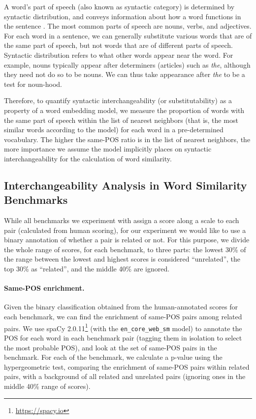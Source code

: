 \documentclass[11pt,a4paper]{article}
\begin{document}
    A word's part of speech (also known as syntactic category)
    is determined by syntactic distribution, and
    conveys information about how a word functions in the sentence \cite{carnie2002syntax}.
    The most common parts of speech are nouns, verbs, and adjectives.
    For each word in a sentence,
    we can generally substitute various words that are of the same part of speech,
    but not words that are of different parts of speech.
    Syntactic distribution refers to what other words appear
    near the word. For example, nouns typically appear after determiners (articles)
    such as \textit{the}, although they need not do so to be nouns. We can thus
    take appearance after \textit{the} to be a test for noun-hood.
    
    Therefore, to quantify syntactic interchangeability (or substitutability)
    as a property of a word embedding model,
    we measure the proportion of words with the same part of speech
    within the list of nearest neighbors
    (that is, the most similar words according to the model)
    for each word in a pre-determined vocabulary.
    The higher the same-POS ratio is in the list of nearest neighbors,
    the more importance we assume the model implicitly places on syntactic interchangeability
    for the calculation of word similarity.
    
    \subsection{Interchangeability Analysis in Word Similarity Benchmarks}\label{sec:benchmark_exp}
    
    While all benchmarks we experiment with assign a score along a scale to each pair
    (calculated from human scoring), for our experiment we would like to use
    a binary annotation of whether a pair is related or not.
    For this purpose, we divide the whole range of scores,
    for each benchmark, to three parts:
    the lowest 30\% of the range between the lowest and highest scores
    is considered ``unrelated'', the top 30\% as ``related'',
    and the middle 40\% are ignored.
    
    \paragraph{Same-POS enrichment.}
    
    Given the binary classification obtained from the human-annotated scores
    for each benchmark, we can find the enrichment of same-POS pairs among
    related pairs.
    We use spaCy 2.0.11\footnote{\url{https://spacy.io}} (with the \texttt{en\_core\_web\_sm} model)
    to annotate the POS for each word in each benchmark
    pair (tagging them in isolation to select the most probable POS),
    and look at the set of same-POS pairs in the benchmark.
    For each of the benchmark, we calculate a p-value using the hypergeometric
    test, comparing the enrichment of same-POS pairs within related pairs,
    with a background of all related and unrelated pairs (ignoring ones in
    the middle 40\% range of scores).
    
\end{document}
